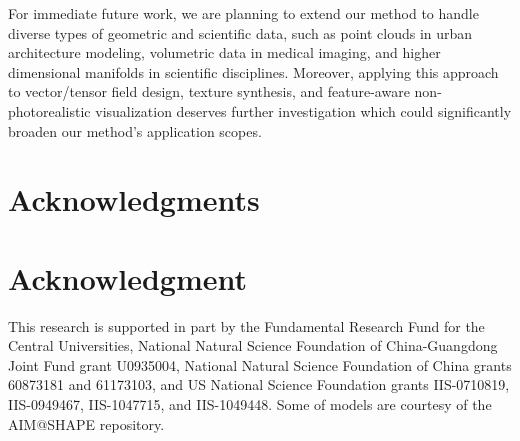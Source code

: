 \documentclass[10pt,journal,cspaper,compsoc]{IEEEtran}
\begin{document}
For immediate future work, we are planning to extend our method to
handle diverse types of geometric and scientific data, such as point
clouds in urban architecture modeling, volumetric data in medical
imaging, and higher dimensional manifolds in scientific
disciplines. Moreover, applying this approach to vector/tensor field
design, texture synthesis, and feature-aware non-photorealistic
visualization deserves further investigation which could significantly
broaden our method's application scopes.


\ifCLASSOPTIONcompsoc
  \section*{Acknowledgments}
\else
  \section*{Acknowledgment}
\fi

This research is supported in part by the Fundamental Research Fund
for the Central Universities, National Natural Science Foundation of
China-Guangdong Joint Fund grant U0935004, National Natural Science
Foundation of China grants 60873181 and 61173103, and US National
Science Foundation grants IIS-0710819, IIS-0949467, IIS-1047715, and
IIS-1049448. Some of models are courtesy of the AIM@SHAPE repository.


\ifCLASSOPTIONcaptionsoff
  \newpage
\fi
\end{document}
